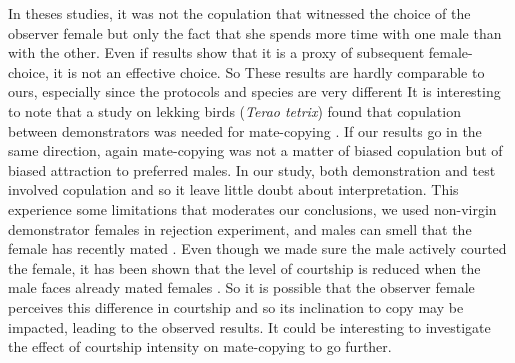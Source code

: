 \documentclass[a4paper, 12pt]{article}
\begin{document}
In theses studies, it was not the copulation that witnessed the choice of the observer female but only the fact that she spends more time with one male than with the other\parencite{dugatkin_lee_alan_reversal_1992,galef_mate-choice_1998}. Even if \textcite{bischoff_tail_1985} results show that it is a proxy of subsequent female-choice, it is not an effective choice. So These results are hardly comparable to ours, especially since the protocols and species are very different
It is interesting to note that a study on lekking birds (\textit{Terao tetrix}) found that copulation between demonstrators was needed for mate-copying \parencite{hoglund_mate_1995}. If our results go in the same direction, again mate-copying was not a matter of biased copulation but of biased attraction to preferred males. In our study, both demonstration and test involved copulation and so it leave little doubt about interpretation. 
This experience some limitations that moderates our conclusions, we used non-virgin demonstrator females in rejection experiment, and males can smell that the female has recently mated \parencite{jallon_few_1984}. 
Even though we made sure the male actively courted the female, it has been shown that the level of courtship is reduced when the male faces already mated females \parencite{cook_attractiveness_1975, tompkins_conditioned_1983}.
So it is possible that the observer female perceives this difference in courtship and so its inclination to copy may be impacted, leading to the observed results. It could be interesting to investigate the effect of courtship intensity on mate-copying to go further.
\end{document}
